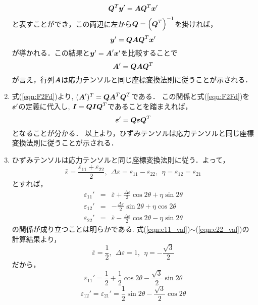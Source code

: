 \documentclass[10pt,a4j]{jarticle}
\begin{document}
\begin{enumerate}
\begin{equation}
		\mbox{\boldmath $Q$}^T \mbox{\boldmath $y$}'
		=
		\mbox{\boldmath $A$}\mbox{\boldmath $Q$}^T \mbox{\boldmath $x$}'
	\end{equation}
	と表すことができ，この両辺に左から$\mbox{\boldmath $Q$}=\left(\mbox{\boldmath $Q$}^T\right)^{-1}$を掛ければ，
	\begin{equation}
		\mbox{\boldmath $y$}'
		=
		\mbox{\boldmath $Q$}\mbox{\boldmath $A$}\mbox{\boldmath $Q$}^T \mbox{\boldmath $x$}'
	\end{equation}
	が導かれる．この結果と$\mbox{\boldmath $y$}' = \mbox{\boldmath $A$}'\mbox{\boldmath $x$}'$を比較することで
	\begin{equation}
		\mbox{\boldmath $A$}'=\mbox{\boldmath $Q$} \mbox{\boldmath $A$}\mbox{\boldmath $Q$}^T
		\label{eqn:F2Fd}
	\end{equation}
	が言え，行列$\mbox{\boldmath $A$}$は応力テンソルと同じ座標変換法則に従うことが示される．
\item
	式(\ref{eqn:F2Fd})より, $(\mbox{\boldmath $A$}')^T=\mbox{\boldmath $Q$}\mbox{\boldmath $A$}^T\mbox{\boldmath $Q$}^T$である．
	この関係と式(\ref{eqn:F2Fd})を$\mbox{\boldmath $\varepsilon$}'$の定義に代入し, 
	$\mbox{\boldmath $I$}=\mbox{\boldmath $Q$}\mbox{\boldmath $I$}\mbox{\boldmath $Q$}^T$であることを踏まえれば，
	\begin{equation}
		\mbox{\boldmath $\varepsilon$}'=\mbox{\boldmath $Q$}\mbox{\boldmath $\varepsilon$}\mbox{\boldmath $Q$}^T
	\end{equation}
	となることが分かる．
	以上より，ひずみテンソルは応力テンソルと同じ座標変換法則に従うことが示される．
\item
	ひずみテンソルは応力テンソルと同じ座標変換法則に従う．よって，
	\begin{equation}
		\bar \varepsilon = \frac{\varepsilon_{11}+ \varepsilon_{22}}{2} , \ \ 
		\Delta  \varepsilon = \varepsilon_{11}- \varepsilon_{22}, \ \ 
		\eta = \varepsilon_{12}=\varepsilon_{21}
	\end{equation}
	とすれば，
	\begin{eqnarray}
		\varepsilon_{11}' &=& 
			\bar \varepsilon + \frac{\Delta \varepsilon}{2} \cos 2\theta + \eta \sin 2\theta 
			\label{eqn:e11d}
			\\
		\varepsilon_{12}' &=& 
			-\frac{\Delta \varepsilon}{2} \sin 2\theta + \eta \cos 2\theta 
			\label{eqn:e12d}
			\\
		\varepsilon_{22}' &=& 
			\bar \varepsilon - \frac{\Delta \varepsilon}{2} \cos 2\theta - \eta \sin 2\theta 
			\label{eqn:e22d}
	\end{eqnarray}
	の関係が成り立つことは明らかである.
	式(\ref{eqn:e11_val})$\sim$(\ref{eqn:e22_val})の計算結果より，
	\[
		\bar\varepsilon = \frac{1}{2}, \ \ \Delta \varepsilon =1, \ \ \eta = -\frac{\sqrt{3}}{2}
	\]
	だから，
	\[
		\varepsilon_{11}'=
		\frac{1}{2} + \frac{1}{2} \cos 2\theta -\frac{\sqrt{3}}{2} \sin 2\theta 
	\]
	\[
		\varepsilon_{12}'=\varepsilon_{21}'
		=
		 \frac{1}{2} \sin 2\theta -\frac{\sqrt{3}}{2} \cos 2\theta 
\]
\end{enumerate}
\end{document}
